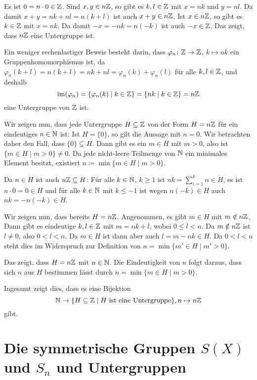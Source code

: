 Es ist $0 = n \cdot 0 \in \mathbb{Z}$. Sind $x,y \in n\mathbb{Z}$, so gibt es $k,l \in \mathbb{Z}$ mit $x = nk$ und $y = nl$. Da damit $x+y = nk + nl = n(k+l)$ ist auch $x+y \in n\mathbb{Z}$. Ist $x \in n\mathbb{Z}$, so gibt es $k \in \mathbb{Z}$ mit $x = nk$. Da damit $-x = -nk = n(-k)$ ist auch $-x \in \mathbb{Z}$. Das zeigt, dass $n\mathbb{Z}$ eine Untergruppe ist.

\begin{bem}
 Ein weniger rechenlastiger Beweis besteht darin, dass $\varphi_n \colon \mathbb{Z} \to \mathbb{Z}$, $k \mapsto nk$ ein Gruppenhomomorphismus ist, da $\varphi_n(k+l) = n(k+l) = nk + nl = \varphi_n(k) + \varphi_n(l)$ für alle $k,l \in \mathbb{Z}$, und deshalb
 \[
  \mathrm{im}(\varphi_n) = \{\varphi_n(k) \mid k \in \mathbb{Z}\} = \{nk \mid k \in \mathbb{Z}\} = n\mathbb{Z}
 \]
 eine Untergruppe von $\mathbb{Z}$ ist.
\end{bem}

Wir zeigen nun, dass jede Untergruppe $H \subseteq \mathbb{Z}$ von der Form $H = n\mathbb{Z}$ für ein eindeutiges $n \in \mathbb{N}$ ist: Ist $H = \{0\}$, so gilt die Aussage mit $n = 0$. Wir betrachten daher den Fall, dass $\{0\} \subsetneq H$. Dann gibt es ein $m \in H$ mit $m > 0$, also ist $\{m \in H \mid m > 0\} \neq 0$. Da jede nicht-leere Teilmenge von $\mathbb{N}$ ein minimales Element besitzt, existiert $n \coloneqq \min \{m \in H \mid m > 0\}$.

Da $n \in H$ ist auch $n\mathbb{Z} \subseteq H$: Für alle $k \in \mathbb{N}$, $k \geq 1$ ist $n k = \sum_{i=1}^k n \in H$, es ist $n \cdot 0 = 0 \in H$ und für alle $k \in \mathbb{N}$ mit $k \leq -1$ ist wegen $n(-k) \in H$ auch $nk = -n(-k) \in H$.

Wir zeigen nun, dass bereits $H = n\mathbb{Z}$. Angenommen, es gibt $m \in H$ mit $m \notin n\mathbb{Z}$. Dann gibt es eindeutige $k,l \in \mathbb{Z}$ mit $m = nk + l$, wobei $0 \leq l < n$. Da $m \notin n\mathbb{Z}$ ist $l \neq 0$, also $0 < l < n$. Da $m \in H$ ist dann aber auch $l = m - nk \in H$. Da $0 < l < n$ steht dies im Widerspruch zur Definition von $n = \min \{m' \in H \mid m' > 0\}$.

Das zeigt, dass $H = n\mathbb{Z}$ mit $n \in \mathbb{N}$. Die Eindeutigkeit von $n$ folgt daraus, dass sich $n$ aus $H$ bestimmen lässt durch $n = \min \{m \in H \mid m > 0\}$.

Ingesamt zeigt dies, dass es eine Bijektion
\[
 \mathbb{N} \rightarrow \{H \subseteq \mathbb{Z} \mid \text{$H$ ist eine Untergruppe}\}, n \mapsto n\mathbb{Z}
\]
gibt.





\section{Die symmetrische Gruppen \texorpdfstring{$S(X)$}{S(X)} und \texorpdfstring{$S_n$}{Sn} und Untergruppen}




